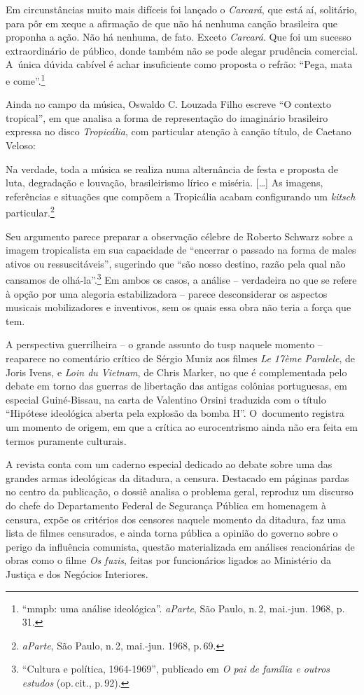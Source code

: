 \startblockquote
Em circunstâncias muito mais difíceis foi lançado o {\it Carcará}, que
está aí, solitário, para pôr em xeque a afirmação de que não há nenhuma
canção brasileira que proponha a ação. Não há nenhuma, de fato. Exceto
{\it Carcará}. Que foi um sucesso extraordinário de público, donde
também não se pode alegar prudência comercial. A~única dúvida cabível é
achar insuficiente como proposta o refrão: “Pega, mata e
come”.\footnote{“{\sc mmpb}: uma análise ideológica”. {\it aParte}, São Paulo,
  n.\,2, mai.-jun. 1968, p.\,31.}
\stopblockquote

Ainda no campo da música, Oswaldo C. Louzada Filho escreve “O
contexto tropical”, em que analisa a forma de representação do
imaginário brasileiro expressa no disco {\it Tropicália}, com particular
atenção à canção título, de Caetano Veloso:

\startblockquote
Na verdade, toda a música se realiza numa alternância de festa e
proposta de luta, degradação e louvação, brasileirismo lírico e miséria.
{[}\ldots{]} As imagens, referências e situações que compõem a Tropicália
acabam configurando um {\it kitsch} particular.\footnote{{\it aParte},
  São Paulo, n.\,2, mai.-jun. 1968, p.\,69.}
\stopblockquote

Seu argumento parece preparar a observação célebre de Roberto Schwarz
sobre a imagem tropicalista em sua
capacidade de “encerrar o passado na forma de males ativos ou
ressuscitáveis”, sugerindo que “são nosso destino, razão pela qual não
cansamos de olhá-la”.\footnote{“Cultura e política, 1964-1969”,
publicado em {\it O pai de família e outros estudos}
  (op.\,cit., p.\,92).} Em ambos os casos, a
análise -- verdadeira no que se refere à opção por uma alegoria
estabilizadora -- parece desconsiderar os aspectos musicais
mobilizadores e inventivos, sem os quais essa obra não teria a força que
tem.

A perspectiva guerrilheira -- o grande assunto do {\sc tusp} naquele momento --
reaparece no comentário crítico de Sérgio Muniz aos filmes {\it Le 17ème
Paralele}, de Joris Ivens, e {\it Loin du Vietnam}, de Chris Marker, no
que é complementada pelo debate em torno das guerras de libertação das
antigas colônias portuguesas, em especial Guiné-Bissau, na carta de
Valentino Orsini traduzida com o título “Hipótese ideológica aberta
pela explosão da bomba H”. O~documento registra um momento de origem, em
que a crítica ao eurocentrismo ainda não era feita em termos puramente
culturais.

A revista conta com um caderno especial dedicado ao debate sobre uma das
grandes armas ideológicas da ditadura, a censura. Destacado em páginas
pardas no centro da publicação, o dossiê analisa o problema geral,
reproduz um discurso do chefe do Departamento Federal de Segurança
Pública em homenagem à censura, expõe os critérios dos censores naquele
momento da ditadura, faz uma lista de filmes censurados, e ainda torna
pública a opinião do governo sobre o perigo da influência comunista,
questão materializada em análises reacionárias de obras como o filme
{\it Os fuzis}, feitas por funcionários ligados ao Ministério da Justiça
e dos Negócios Interiores.

